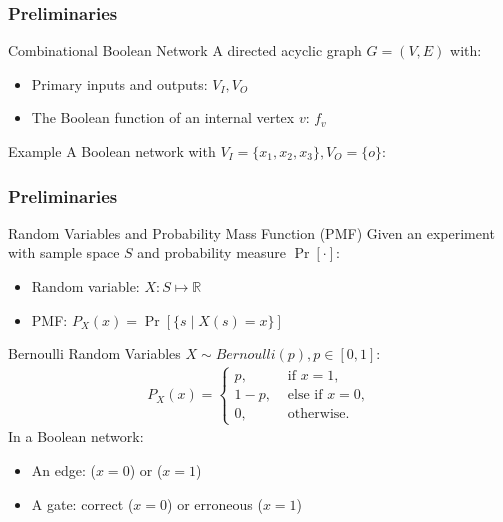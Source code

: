 \begin{frame}
  \frametitle{Preliminaries}
  \begin{block}{Combinational Boolean Network}
    A directed acyclic graph $G=(V,E)$ with:
    \pause
    \begin{itemize}
      \item Primary inputs and outputs: $V_I,V_O$
            \pause
      \item The Boolean function of an internal vertex $v$: $f_v$
            \pause
    \end{itemize}
  \end{block}
  \begin{block}{Example}
    A Boolean network with $V_I=\{x_1,x_2,x_3\},V_O=\{o\}$:
    \begin{figure}
      \centering
      
    \end{figure}
  \end{block}
\end{frame}

\begin{frame}
  \frametitle{Preliminaries}
  \begin{block}{Random Variables and Probability Mass Function (PMF)}
    Given an experiment with sample space $S$ and probability measure $\Pr[\cdot]$:
    \pause
    \begin{itemize}
      \item Random variable: $X:S\mapsto\mathbb{R}$
            \pause
      \item PMF: $P_X(x)=\Pr[\{s \mid X(s)=x\}]$
    \end{itemize}
  \end{block}
  \pause
  \begin{block}{Bernoulli Random Variables}
    $X\sim\textit{Bernoulli}(p),p\in[0,1]$:
    \pause
    \begin{align*}
      P_X(x)=
      \left\{
      \begin{array}{ll}
        p,   & \mbox{ if } x = 1,      \\
        1-p, & \mbox{ else if } x = 0, \\
        0,   & \mbox{ otherwise. }
      \end{array}
      \right.
    \end{align*}
    \pause
    In a Boolean network:
    \pause
    \begin{itemize}
      \item An edge: \false ($x=0$) or \true ($x=1$)
            \pause
      \item A gate: correct ($x=0$) or erroneous ($x=1$)
    \end{itemize}
  \end{block}
\end{frame}